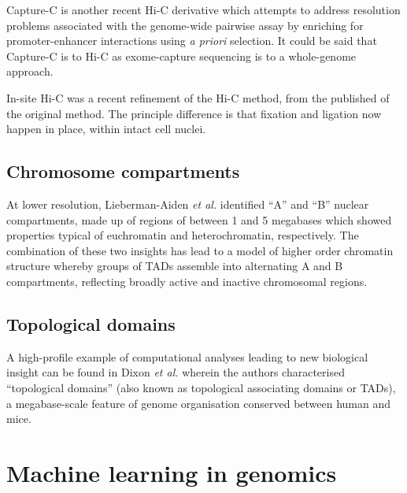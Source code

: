 \documentclass[a4paper,10pt,oneside]{book}
\begin{document}
Capture-C is another recent Hi-C derivative which attempts to address resolution problems associated with the genome-wide pairwise assay by enriching for promoter-enhancer interactions using \emph{a priori} selection.\cite{Mifsud2015} It could be said that Capture-C is to Hi-C as exome-capture sequencing is to a whole-genome approach.

In-site Hi-C was a recent refinement of the Hi-C method, from the published of the original method.\cite{Rao2014} The principle difference is that fixation and ligation now happen in place, within intact cell nuclei.

\subsection{Chromosome compartments}

At lower resolution, Lieberman-Aiden \emph{et
  al.}\cite{Lieberman2009} identified ``A'' and ``B'' nuclear compartments,
made up of regions of between 1 and 5 megabases which showed properties typical
of euchromatin and heterochromatin, respectively. The combination
of these two insights has lead to a model of higher order chromatin
structure whereby groups of TADs assemble into alternating A and B
compartments, reflecting broadly active and inactive chromosomal
regions.\cite{Dekker2013} \\

\subsection{Topological domains}

A high-profile example of computational analyses leading to new
biological insight can be found in Dixon \emph{et al.}\cite{Dixon2012}
wherein the authors characterised ``topological domains'' (also known
as topological associating domains or TADs), a
megabase-scale feature of genome organisation conserved between human
and mice.

\section{Machine learning in genomics}
\end{document}
